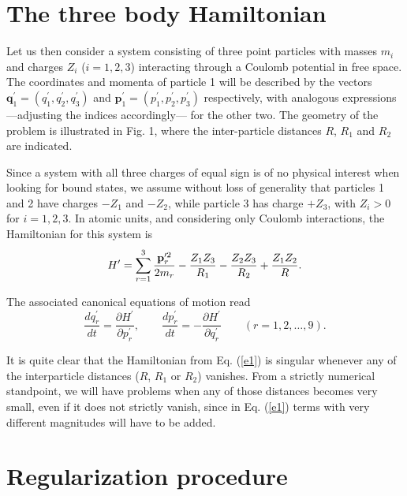 \documentclass[thmsa]{article}
\begin{document}
\section{The three body Hamiltonian}

Let us then consider a system consisting of three point particles with
masses $m_i$ and charges $Z_i$ ($i=1,2,3$) interacting through a Coulomb
potential in free space. The coordinates and momenta of particle 1 will be
described by the vectors $\mathbf{q}_1^{\prime }=\left( q_1^{\prime
},q_2^{\prime },q_3^{\prime }\right) $ and $\mathbf{p}_1^{\prime }=\left(
p_1^{\prime },p_2^{\prime },p_3^{\prime }\right) $ respectively, with
analogous expressions ---adjusting the indices accordingly--- for the other
two. The geometry of the problem is illustrated in Fig. 1, where the
inter-particle distances $R$, $R_1$ and $R_2$ are indicated.

Since a system with all three charges of equal sign is of no physical
interest when looking for bound states, we assume without loss of generality
that particles 1 and 2 have charges $-Z_1$ and $-Z_2$, while particle 3 has
charge $+Z_3$, with $Z_i>0$ for $i=1,2,3$. In atomic units, and considering
only Coulomb interactions, the Hamiltonian for this system is 
\begin{equation}
H^{\prime }=\sum_{r=1}^3\frac{\mathbf{p}_r^{\prime 2}}{2m_r}-\frac{Z_1Z_3}{%
R_1}-\frac{Z_2Z_3}{R_2}+\frac{Z_1Z_2}R.  \label{e1}
\end{equation}

The associated canonical equations of motion read 
\begin{equation}
\frac{dq_r^{\prime }}{dt}=\frac{\partial H^{\prime }}{\partial p_r^{\prime }}%
,\qquad \frac{dp_r^{\prime }}{dt}=-\frac{\partial H^{\prime }}{\partial
q_r^{\prime }}\qquad (r=1,2,\ldots ,9).  \label{e2}
\end{equation}

It is quite clear that the Hamiltonian from Eq. (\ref{e1}) is singular
whenever any of the interparticle distances ($R$, $R_1$ or $R_2$) vanishes.
From a strictly numerical standpoint, we will have problems when any of
those distances becomes very small, even if it does not strictly vanish,
since in Eq. (\ref{e1}) terms with very different magnitudes will have to be
added.

\section{Regularization procedure}
\end{document}
